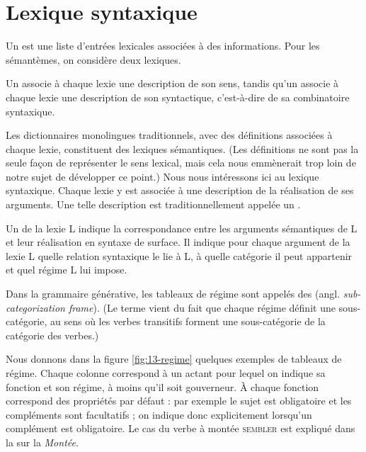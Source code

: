 \section{Lexique syntaxique}
Un  est une liste d’entrées lexicales associées à des informations. Pour les sémantèmes, on considère deux lexiques.

{Un  associe à chaque lexie une description de son sens, tandis qu’un  associe à chaque lexie une description de son syntactique, c'est-à-dire de sa combinatoire syntaxique.}

Les dictionnaires monolingues traditionnels, avec des définitions associées à chaque lexie, constituent des lexiques sémantiques. (Les définitions ne sont pas la seule façon de représenter le sens lexical, mais cela nous emmènerait trop loin de notre sujet de développer ce point.) Nous nous intéressons ici au lexique syntaxique. Chaque lexie y est associée à une description de la réalisation de ses arguments. Une telle description est traditionnellement appelée un .\largerpage

{Un  de la lexie L indique la correspondance entre les arguments sémantiques de L et leur réalisation en syntaxe de surface. Il indique pour chaque argument de la lexie L quelle relation syntaxique le lie à L, à quelle catégorie il peut appartenir et quel régime L lui impose.}

Dans la grammaire générative, les tableaux de régime sont appelés des  (angl. \textit{sub-categorization frame}). (Le terme vient du fait que chaque régime définit une sous-catégorie, au sens où les verbes transitifs forment une sous-catégorie de la catégorie des verbes.)

Nous donnons dans la figure \ref{fig:13-regime} quelques exemples de tableaux de régime. Chaque colonne correspond à un actant pour lequel on indique sa fonction et son régime, à moins qu'il soit gouverneur. À chaque fonction correspond des propriétés par défaut : par exemple le sujet est obligatoire et les compléments sont facultatifs ; on indique donc explicitement lorsqu'un complément est obligatoire. Le cas du verbe à montée \textsc{sembler} est expliqué dans la  sur la \textit{Montée}.


